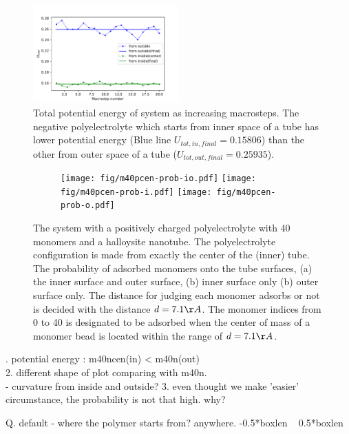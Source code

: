     \begin{figure}[h!]
      \centering
        \includegraphics[width=0.5\textwidth]{fig/m40n-m40ncen-u.pdf}
     \caption{Total potential energy of system as increasing macrosteps. The negative polyelectrolyte which starts from inner space of a tube has lower potential energy (Blue line $U_{tot, in, final} = 0.15806$) than the other from outer space of a tube ($U_{tot, out, final} = 0.25935$).}
    \label{fig:m40n-m40ncen-u}
    \end{figure}

    \begin{figure}[h!]
      \centering
        \begin{subfigure}{\linewidth}
          \centering
            \texttt{[image: fig/m40pcen-prob-io.pdf]}  
            \texttt{[image: fig/m40pcen-prob-i.pdf]}
            \texttt{[image: fig/m40pcen-prob-o.pdf]}
            \end{subfigure}\par\medskip
     \caption{The system with a positively charged polyelectrolyte with 40 monomers and a halloysite nanotube. The polyelectrolyte configuration is made from exactly the center of the (inner) tube. The probability of adsorbed monomers onto the tube surfaces, (a) the inner surface and outer surface, (b) inner surface only (b) outer surface only. The distance for judging each monomer adsorbs or not is decided with the distance $d = 7.1\AA$. The monomer indices from 0 to 40 is designated to be adsorbed when the center of mass of a monomer bead is located within the range of $d = 7.1\AA$.  }
    \label{fig:m40ncen-prob} %
    \end{figure}





. potential energy : m40ncen(in) < m40n(out) \\
2. different shape of plot comparing with m40n. \\
- curvature from inside and outside?
3. even thought we make 'easier' circumstance, the probability is not that high. why?

Q. default - where the polymer starts from? anywhere. -0.5*boxlen ~ 0.5*boxlen
 \\



























\cleardoublepage